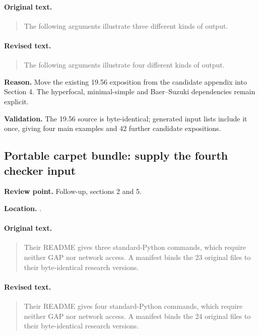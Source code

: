 \paragraph{Original text.}
\begin{quote}\small
The following arguments illustrate three different kinds of output.
\end{quote}

\paragraph{Revised text.}
\begin{quote}\small
The following arguments illustrate four different kinds of output.
\end{quote}

\noindent\textbf{Reason.} Move the existing 19.56 exposition from the candidate appendix into Section 4. The hyperfocal, minimal-simple and Baer--Suzuki dependencies remain explicit.

\noindent\textbf{Validation.} The 19.56 source is byte-identical; generated input lists include it once, giving four main examples and 42 further candidate expositions.

\subsection{Portable carpet bundle: supply the fourth checker input}
\noindent\textbf{Review point.} Follow-up, sections 2 and 5.\par
\noindent\textbf{Location.} .

\paragraph{Original text.}
\begin{quote}\small
Their README gives three standard-Python
commands, which require neither GAP nor network access. A manifest
binds the 23 original files to their byte-identical research versions.
\end{quote}

\paragraph{Revised text.}
\begin{quote}\small
Their README gives four standard-Python
commands, which require neither GAP nor network access. A manifest
binds the 24 original files to their byte-identical research versions.
\end{quote}

